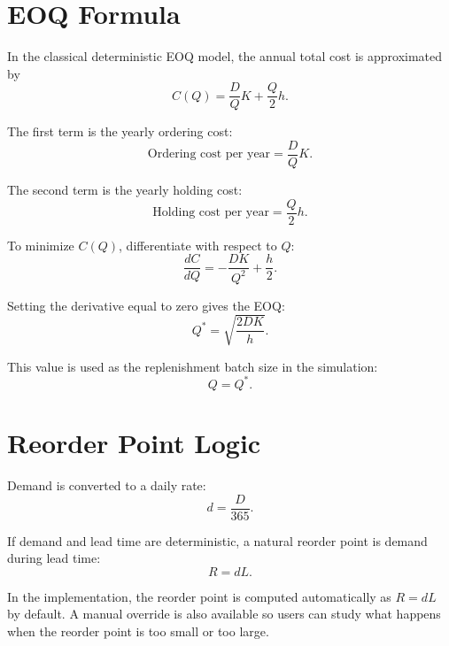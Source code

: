 \documentclass[11pt]{article}
\begin{document}
\section{EOQ Formula}
In the classical deterministic EOQ model, the annual total cost is approximated by
\begin{equation}
C(Q) = \frac{D}{Q}K + \frac{Q}{2}h.
\end{equation}

The first term is the yearly ordering cost:
\begin{equation}
\text{Ordering cost per year} = \frac{D}{Q}K.
\end{equation}

The second term is the yearly holding cost:
\begin{equation}
\text{Holding cost per year} = \frac{Q}{2}h.
\end{equation}

To minimize $C(Q)$, differentiate with respect to $Q$:
\begin{equation}
\frac{dC}{dQ} = -\frac{DK}{Q^2} + \frac{h}{2}.
\end{equation}

Setting the derivative equal to zero gives the EOQ:
\begin{equation}
Q^* = \sqrt{\frac{2DK}{h}}.
\end{equation}

This value is used as the replenishment batch size in the simulation:
\begin{equation}
Q = Q^*.
\end{equation}

\section{Reorder Point Logic}
Demand is converted to a daily rate:
\begin{equation}
d = \frac{D}{365}.
\end{equation}

If demand and lead time are deterministic, a natural reorder point is demand during lead time:
\begin{equation}
R = dL.
\end{equation}

In the implementation, the reorder point is computed automatically as $R=dL$ by default. A manual override is also available so users can study what happens when the reorder point is too small or too large.
\end{document}
